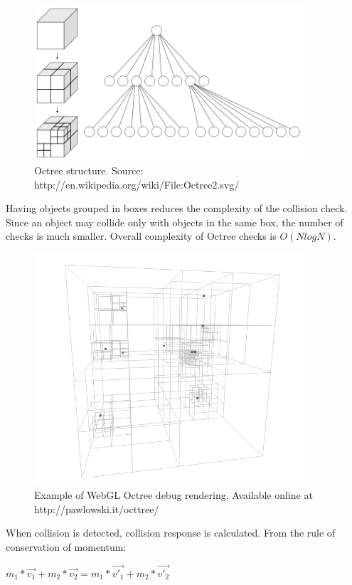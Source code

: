 \begin{figure}[h!]
  \caption{Octree structure. Source: http://en.wikipedia.org/wiki/File:Octree2.svg/}
  \label{img:octree2}
  \centering
	\includegraphics[width=10cm]{octree/octree2.png}
\end{figure} 

Having objects grouped in boxes reduces the complexity of the collision check. Since an object may collide only with objects in the same box, the number of checks is much smaller. Overall complexity of Octree checks is $O(N log{N})$.

\begin{figure}[h!]
  \caption{Example of WebGL Octree debug rendering. Available online at http://pawlowski.it/octtree/}
  \label{img:octree}
  \centering
	\includegraphics[width=10cm]{octree/octree.png}
\end{figure} 

When collision is detected, collision response is calculated. From the rule of conservation of momentum:

\begin{center}
$m_1 * \vec{v_1} + m_2 * \vec{v_2} = m_1 * \vec{v'_1} + m_2 * \vec{v'_2}$
\end{center}

